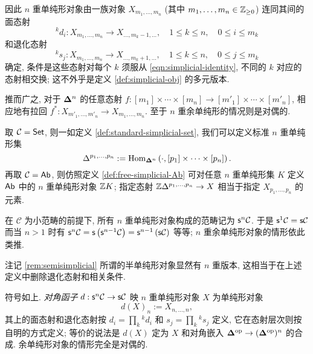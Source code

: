 因此 $n$ 重单纯形对象由一族对象 $X_{m_1, \ldots, m_n}$ (其中 $m_1, \ldots, m_n \in \mathbb{Z}_{\geq 0}$) 连同其间的面态射
\[ {}^k d_i: X_{m_1, \ldots, m_n} \to X_{\ldots, m_k - 1, \ldots}, \quad 1 \leq k \leq n, \quad 0 \leq i \leq m_k \]
和退化态射
\[ {}^k s_j: X_{m_1, \ldots, m_n} \to X_{\ldots, m_k + 1, \ldots}, \quad 1 \leq k \leq n, \quad 0 \leq j \leq m_k \]
确定, 条件是这些态射对每个 $k$ 须服从 \eqref{eqn:simplicial-identity}, 不同的 $k$ 对应的态射相交换; 这不外乎是定义 \ref{def:simplicial-obj} 的多元版本.

推而广之, 对于 $\bm\Delta^n$ 的任意态射 $f: [m_1] \times \cdots \times [m_n] \to [m'_1] \times \cdots \times [m'_n]$, 相应地有拉回 $f^*: X_{m'_1, \ldots, m'_n} \to X_{m_1, \ldots, m_n}$. 至于 $n$ 重余单纯形的情况则是对偶的.

\begin{example}\label{eg:standard-n-fold-sSet}
	取 $\mathcal{C} = \mathsf{Set}$, 则一如定义 \ref{def:standard-simplicial-set}, 我们可以定义标准 $n$ 重单纯形集
	\[ \Delta^{p_1, \ldots, p_n} := \operatorname{Hom}_{\bm\Delta^n}\left(\cdot, [p_1] \times \cdots \times [p_n] \right). \]
	再取 $\mathcal{C} = \mathsf{Ab}$, 则仿照定义 \ref{def:free-simplicial-Ab} 可对任意 $n$ 重单纯形集 $K$ 定义 $\mathsf{Ab}$ 中的 $n$ 重单纯形对象 $\mathbb{Z} K$; 指定态射 $\mathbb{Z} \Delta^{p_1, \ldots, p_n} \to X$ 相当于指定 $X_{p_1, \ldots, p_n}$ 的元素.
\end{example}

在 $\mathcal{C}$ 为小范畴的前提下, 所有 $n$ 重单纯形对象构成的范畴记为 $\mathsf{s}^n \mathcal{C}$. 于是 $\mathsf{s}^1 \mathcal{C} = \mathsf{s}\mathcal{C}$ 而当 $n > 1$ 时有 $\mathsf{s}^n \mathcal{C} = \mathsf{s}\left( \mathsf{s}^{n-1} \mathcal{C} \right) = \mathsf{s}^{n-1}\left(\mathsf{s}\mathcal{C}\right)$ 等等; $n$ 重余单纯形对象的情形依此类推.

注记 \ref{rem:semisimplicial} 所谓的半单纯形对象显然有 $n$ 重版本, 这相当于在上述定义中删除退化态射和相关条件.

\begin{definition}\label{def:bisimplicial-diagonal}
	符号如上. \emph{对角函子} $d: \mathsf{s}^n \mathcal{C} \to \mathsf{s}\mathcal{C}$ 映 $n$ 重单纯形对象 $X$ 为单纯形对象
	\[ d(X)_n := X_{n, \ldots, n}, \]
	其上的面态射和退化态射按 $d_i = \prod_k {}^k d_i$ 和 $s_j = \prod_k {}^k s_j$ 定义, 它在态射层次则按自明的方式定义; 等价的说法是 $d(X)$ 定为 $X$ 和对角嵌入 $\bm\Delta^{\operatorname{op}} \to (\bm\Delta^{\operatorname{op}})^n$ 的合成. 余单纯形对象的情形完全是对偶的.
\end{definition}

